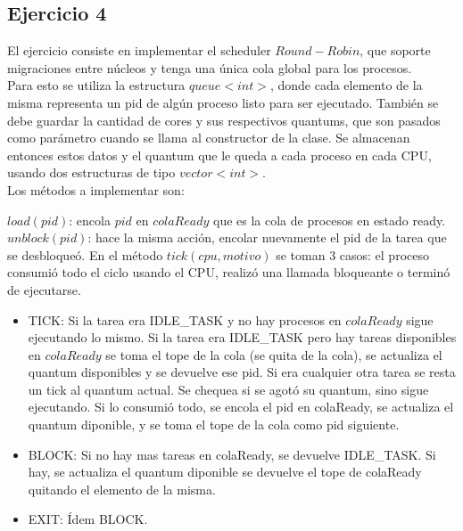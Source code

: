 \subsection{Ejercicio 4}

El ejercicio consiste en implementar el scheduler $Round-Robin$, que soporte migraciones entre núcleos y tenga una única cola global
para los procesos. \\

Para esto se utiliza la estructura $queue<int>$, donde cada elemento de la misma representa un pid de algún proceso listo para ser ejecutado.
También se debe guardar la cantidad de cores y sus respectivos quantums, que son pasados como parámetro cuando se llama al constructor de la clase. 
Se almacenan entonces estos datos y el quantum que le queda a cada proceso en cada CPU, usando dos estructuras de tipo $vector<int>$.\\

Los métodos a implementar son:
 
$load(pid)$: encola $pid$ en $colaReady$ que es la cola de procesos en estado ready.
$unblock(pid)$: hace la misma acción, encolar nuevamente el pid de la tarea que se desbloqueó.
En el método $tick(cpu, motivo)$ se toman 3 casos: el proceso consumió todo el ciclo usando el CPU, realizó una llamada bloqueante o terminó
 de ejecutarse. \\

\begin{itemize}
\item TICK: Si la tarea era IDLE_TASK y no hay procesos en $colaReady$ sigue ejecutando lo mismo.
			Si la tarea era IDLE_TASK pero hay tareas disponibles en $colaReady$ se toma el tope de la cola (se quita de la cola), se actualiza el quantum disponibles
			 y se devuelve ese pid.
			Si era cualquier otra tarea se resta un tick al quantum actual. Se chequea si se agotó su quantum, sino sigue ejecutando. Si lo consumió todo, se encola 
			el pid en colaReady, se actualiza el quantum diponible, y se toma el tope de la cola como pid siguiente.
\item BLOCK: Si no hay mas tareas en colaReady, se devuelve IDLE_TASK.
				Si hay, se actualiza el quantum diponible se devuelve el tope de colaReady quitando el elemento de la misma.
\item EXIT: Ídem BLOCK.
\end{itemize}

